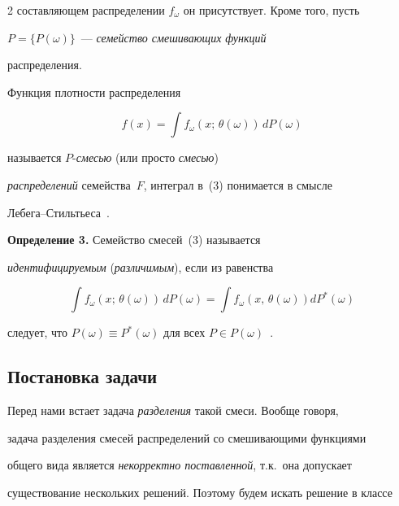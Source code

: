 \begin{multicols}{2}
составляющем распределении $f_\omega$ он присутствует. Кроме того, пусть


$P = \{P(\omega )\}$~--- \textit{семейство смешивающих функций}


распределения.





Функция плотности распределения


\begin{equation}


f(x) = \int f_\omega (x;\,\theta(\omega ))\,dP (\omega )


\end{equation}


называется $P$-\textit{смесью} (или просто \textit{смесью})


\textit{распределений} семейства~$F$,  интеграл в~(3) понимается в смысле


Лебега--Стильтьеса~\cite{3bat}.





\medskip


\textbf{Определение 3.} Семейство смесей~(3) называется


\textit{идентифицируемым} (\textit{различимым}), если из равенства


$$


\int f_\omega (x;\,\theta(\omega ))\,dP (\omega ) =\int f_\omega


(x,\,\theta(\omega )) dP^*(\omega )


$$


следует, что $P(\omega ) \equiv P^*(\omega )$ для всех $P \in P(\omega


)$~\cite{3bat}.





\subsection{Постановка задачи} %





Перед нами встает задача \textit{разделения} такой смеси. Вообще говоря,


задача разделения смесей распределений со смешивающими функциями


общего вида является \textit{некорректно поставленной}, т.к.\ она допускает


существование нескольких решений. Поэтому будем искать решение в классе



\end{multicols}

